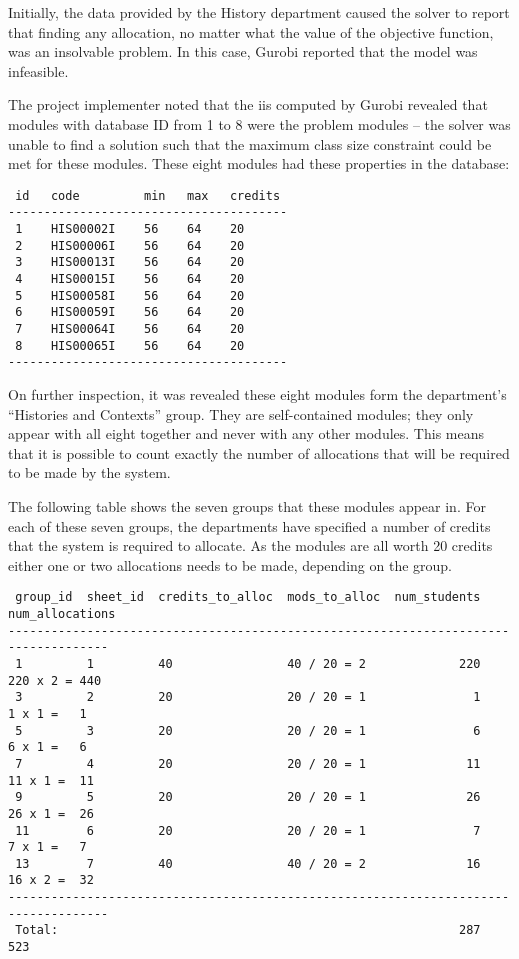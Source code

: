 Initially, the data provided by the History department caused the solver to
report that finding any allocation, no matter what the value of the objective
function, was an insolvable problem. In this case, Gurobi reported that the
model was infeasible.

The project implementer noted that the \gls{iis} computed by Gurobi revealed
that modules with database ID from 1 to 8 were the problem modules -- the
solver was unable to find a solution such that the maximum class size
constraint could be met for these modules. These eight modules had these
properties in the database:

\begin{verbatim}
 id   code         min   max   credits
---------------------------------------
 1    HIS00002I    56    64    20
 2    HIS00006I    56    64    20
 3    HIS00013I    56    64    20
 4    HIS00015I    56    64    20
 5    HIS00058I    56    64    20
 6    HIS00059I    56    64    20
 7    HIS00064I    56    64    20
 8    HIS00065I    56    64    20
---------------------------------------
\end{verbatim}

On further inspection, it was revealed these eight modules form the
department's ``Histories and Contexts'' group. They are self-contained
modules; they only appear with all eight together and never with any other
modules. This means that it is possible to count exactly the number of
allocations that will be required to be made by the system.

The following table shows the seven groups that these modules appear in. For
each of these seven groups, the departments have specified a number of credits
that the system is required to allocate. As the modules are all worth 20
credits either one or two allocations needs to be made, depending on the
group.

\begin{verbatim}
 group_id  sheet_id  credits_to_alloc  mods_to_alloc  num_students  num_allocations
------------------------------------------------------------------------------------
 1         1         40                40 / 20 = 2             220    220 x 2 = 440
 3         2         20                20 / 20 = 1               1      1 x 1 =   1
 5         3         20                20 / 20 = 1               6      6 x 1 =   6
 7         4         20                20 / 20 = 1              11     11 x 1 =  11
 9         5         20                20 / 20 = 1              26     26 x 1 =  26
 11        6         20                20 / 20 = 1               7      7 x 1 =   7
 13        7         40                40 / 20 = 2              16     16 x 2 =  32
------------------------------------------------------------------------------------
 Total:                                                        287              523
\end{verbatim}


